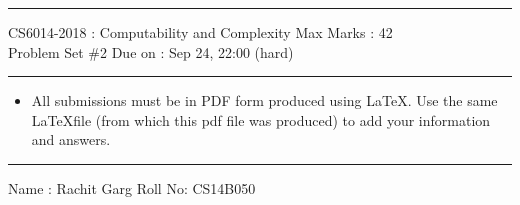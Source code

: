 \documentclass[solution,addpoints,12pt]{exam}
\begin{document}
\hrule
\vspace{3mm}
\noindent 
{\sf CS6014-2018 : Computability and Complexity  \hfill Max Marks : 42}
\vspace{3mm}\\
\noindent 
{\sf Problem Set \#2 \hfill Due on : Sep 24, 22:00 (hard)}
\vspace{3mm}
\hrule
{\small
\begin{itemize}
\item All submissions must be in PDF form produced using \LaTeX. Use the same \LaTeX file (from which this pdf file was produced) to add your information and answers.
\end{itemize}}
\hrule
\vspace{3mm}
{\sf Name : Rachit Garg \hfill Roll No: CS14B050}
\vspace{3mm}
\end{document}
